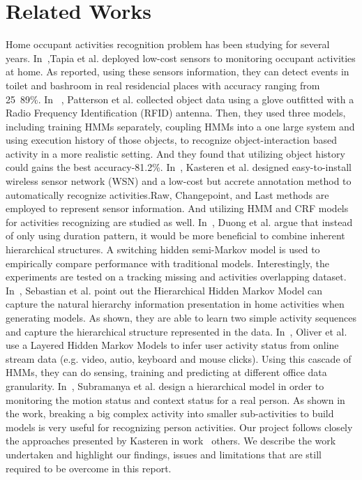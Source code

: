 \section{Related Works}

Home occupant activities recognition problem has been studying for several years. In~\cite{emtapia},Tapia et al. deployed low-cost sensors to monitoring occupant activities at home. As reported, using these sensors information, they can detect events in toilet and bashroom in real residencial places with accuracy ranging from 25~89\%. In ~\cite{djpatt}, Patterson et al. collected object data using a glove outfitted with a Radio Frequency Identification (RFID) antenna. Then, they used three models, including training HMMs separately, coupling HMMs into a one large system and using execution history of those objects, to recognize object-interaction based activity in a more realistic setting. And they found that utilizing object history could gains the best accuracy-81.2\%. In~\cite{tvkasteren}, Kasteren et al. designed easy-to-install wireless sensor network (WSN) and a low-cost but accrete annotation method to automatically recognize activities.Raw, Changepoint, and Last methods are employed to represent sensor information. And utilizing HMM and CRF models for activities recognizing are studied as well. In~\cite{tduong}, Duong et al. argue that instead of only using duration pattern, it would be more beneficial to combine inherent hierarchical structures. A switching hidden semi-Markov model is used to empirically compare performance with traditional models. Interestingly, the experiments are tested on a tracking missing and activities overlapping dataset. In~\cite{sluhr}, Sebastian et al. point out the Hierarchical Hidden Markov Model can capture the natural hierarchy information presentation in home activities when generating models. As shown, they are able to learn two simple activity sequences and capture the hierarchical structure represented in the data. In~\cite{noliver}, Oliver et al. use a Layered Hidden Markov Models to infer user activity status from online stream data (e.g. video, autio, keyboard and mouse clicks). Using this cascade of HMMs, they can do sensing, training and predicting at different office data granularity. In~\cite{asubr}, Subramanya et al. design a hierarchical model in order to monitoring the motion status and context status for a real person. As shown in the work, breaking a big complex activity into smaller sub-activities to build models is very useful for recognizing person activities. Our project follows closely the approaches presented by Kasteren in work~\cite{tvkasteren}  others. We describe the work undertaken and highlight our findings, issues and limitations that are still required to be overcome in this report.